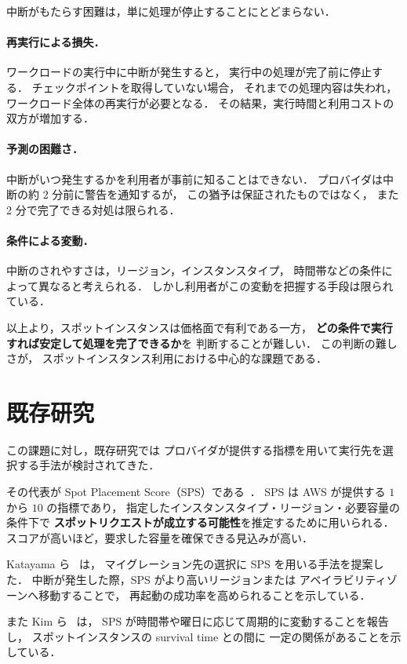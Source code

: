 \documentclass[11pt,a4paper]{ltjsreport}
\begin{document}
中断がもたらす困難は，単に処理が停止することにとどまらない．

\paragraph{再実行による損失．}
ワークロードの実行中に中断が発生すると，
実行中の処理が完了前に停止する．
チェックポイントを取得していない場合，
それまでの処理内容は失われ，
ワークロード全体の再実行が必要となる．
その結果，実行時間と利用コストの双方が増加する．

\paragraph{予測の困難さ．}
中断がいつ発生するかを利用者が事前に知ることはできない．
プロバイダは中断の約 2 分前に警告を通知するが，
この猶予は保証されたものではなく，
また 2 分で完了できる対処は限られる．

\paragraph{条件による変動．}
中断のされやすさは，リージョン，インスタンスタイプ，
時間帯などの条件によって異なると考えられる．
しかし利用者がこの変動を把握する手段は限られている．

以上より，スポットインスタンスは価格面で有利である一方，
\textbf{どの条件で実行すれば安定して処理を完了できるか}を
判断することが難しい．
この判断の難しさが，
スポットインスタンス利用における中心的な課題である．

\section{既存研究}
\label{sec:existing}

この課題に対し，既存研究では
プロバイダが提供する指標を用いて実行先を選択する手法が検討されてきた．

その代表が Spot Placement Score（SPS）である~\cite{AWSSPS}．
SPS は AWS が提供する $1$ から $10$ の指標であり，
指定したインスタンスタイプ・リージョン・必要容量の条件下で
\textbf{スポットリクエストが成立する可能性}を推定するために用いられる．
スコアが高いほど，要求した容量を確保できる見込みが高い．

Katayama ら~\cite{Katayama2022} は，
マイグレーション先の選択に SPS を用いる手法を提案した．
中断が発生した際，SPS がより高いリージョンまたは
アベイラビリティゾーンへ移動することで，
再起動の成功率を高められることを示している．

また Kim ら~\cite{Kim2024SpotInterruption} は，
SPS が時間帯や曜日に応じて周期的に変動することを報告し，
スポットインスタンスの survival time との間に
一定の関係があることを示している．
\end{document}
